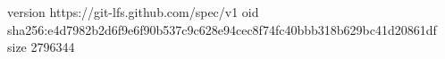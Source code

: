 version https://git-lfs.github.com/spec/v1
oid sha256:e4d7982b2d6f9e6f90b537c9c628e94cec8f74fc40bbb318b629bc41d20861df
size 2796344
